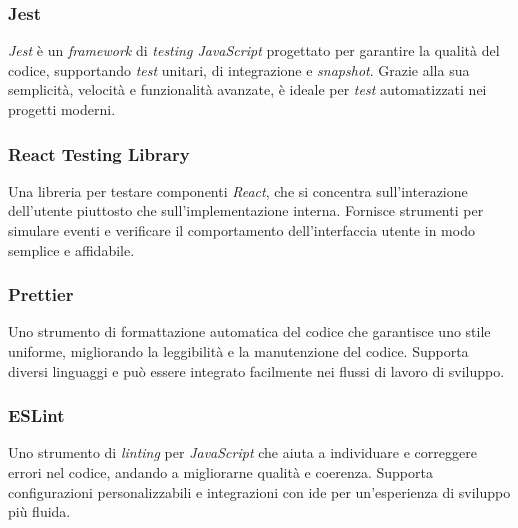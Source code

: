 \subsubsection{Jest}

\textit{Jest} è un \textit{framework} di \textit{testing JavaScript} progettato per garantire la qualità del codice, supportando \textit{test} unitari, di integrazione e \textit{snapshot}.
Grazie alla sua semplicità, velocità e funzionalità avanzate, è ideale per \textit{test} automatizzati nei progetti moderni.

\subsubsection{React Testing Library}

Una libreria per testare componenti \textit{React}, che si concentra sull'interazione dell'utente piuttosto che sull'implementazione interna. 
Fornisce strumenti per simulare eventi e verificare il comportamento dell'interfaccia utente in modo semplice e affidabile.

\subsubsection{Prettier}

Uno strumento di formattazione automatica del codice che garantisce uno stile uniforme, migliorando la leggibilità e la manutenzione del codice. 
Supporta diversi linguaggi e può essere integrato facilmente nei flussi di lavoro di sviluppo.

\subsubsection{ESLint}

Uno strumento di \textit{linting} per \textit{JavaScript} che aiuta a individuare e correggere errori nel codice, andando a migliorarne qualità e coerenza.
Supporta configurazioni personalizzabili e integrazioni con \gls{ide} per un'esperienza di sviluppo più fluida.


